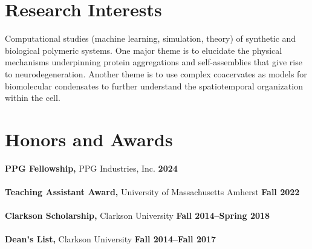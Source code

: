 \documentclass[margin,line]{res}
\begin{document}
\begin{resume}
	\vspace{-1em}

	\section{\sc Research Interests}
	Computational studies (machine learning, simulation, theory) of synthetic and
	biological polymeric systems. One major theme is to elucidate the physical
	mechanisms underpinning protein aggregations and self-assemblies that give
	rise to neurodegeneration. Another theme is to use complex coacervates as
	models for biomolecular condensates to further understand the spatiotemporal
	organization within the cell.

	\section{\sc Honors and Awards}
	 {\bf PPG Fellowship,} PPG Industries, Inc. \hfill {\bf 2024}\\
	\\
	{\bf Teaching Assistant Award,} University of Massachusetts Amherst \hfill {\bf Fall 2022}\\
	\\
	{\bf Clarkson Scholarship,} Clarkson University \hfill {\bf Fall 2014--Spring 2018}\\
	\\
	{\bf Dean's List,} Clarkson University \hfill {\bf Fall 2014--Fall 2017}\\

	\vspace{-1em}


\end{resume}
\end{document}
